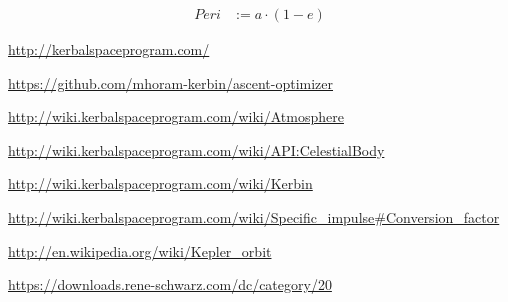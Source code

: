 \documentclass[11pt]{article}
\begin{document}
\begin{align}
Peri & := a \cdot (1 - e)
\end{align}

\begin{thebibliography}{Kerbin}

  \url{http://kerbalspaceprogram.com/}

  \url{https://github.com/mhoram-kerbin/ascent-optimizer}

  \url{http://wiki.kerbalspaceprogram.com/wiki/Atmosphere}

  \url{http://wiki.kerbalspaceprogram.com/wiki/API:CelestialBody}

  \url{http://wiki.kerbalspaceprogram.com/wiki/Kerbin}

  \url{http://wiki.kerbalspaceprogram.com/wiki/Specific_impulse#Conversion_factor}

  \url{http://en.wikipedia.org/wiki/Kepler_orbit}

  \url{https://downloads.rene-schwarz.com/dc/category/20}

\end{thebibliography}
\end{document}
